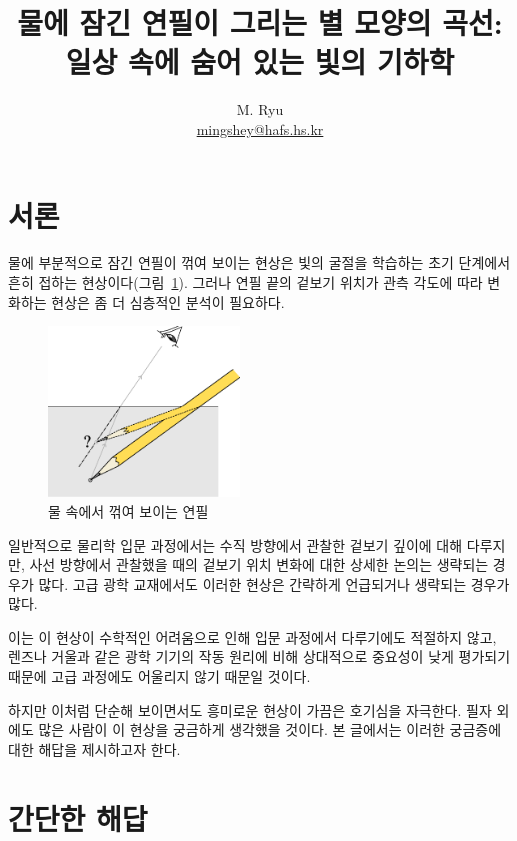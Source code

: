 \documentclass[twocolumn]{article}
\title{물에 잠긴 연필이 그리는 별 모양의 곡선:\\ 일상 속에 숨어 있는 빛의 기하학}
\author{M. Ryu \\ {\href{mailto:mingshey@hafs.hs.kr}{mingshey@hafs.hs.kr}}}
\begin{document}
\maketitle
\newcommand{\romana}{{a}}
\newcommand{\romanb}{{b}}
\newcommand{\romanA}{{A}}
\newcommand{\romanB}{{B}}
\newcommand{\greeka}{{\alpha}}
\newcommand{\greekb}{{\beta}}
\newcommand{\Aprime}{{A^{\prime}}}
\newcommand{\Bprime}{{B^{\prime}}}
\renewcommand{\figurename}{그림}
\section{서론}

물에 부분적으로 잠긴 연필이 꺾여 보이는 현상은 빛의 굴절을 학습하는 초기 단계에서 흔히 접하는 현상이다(\figurename\ \ref{fig:pencil}). 그러나 연필 끝의 겉보기 위치가 관측 각도에 따라 변화하는 현상은 좀 더 심층적인 분석이 필요하다. 

\begin{figure}[ht]
	\centering
	\includegraphics[width=2in]{figs/g164.eps}
	\caption{물 속에서 꺾여 보이는 연필}
	\label{fig:pencil}
\end{figure}

일반적으로 물리학 입문 과정에서는 수직 방향에서 관찰한 겉보기 깊이에 대해 다루지만, 사선 방향에서 관찰했을 때의 겉보기 위치 변화에 대한 상세한 논의는 생략되는 경우가 많다. 고급 광학 교재에서도 이러한 현상은 간략하게 언급되거나 생략되는 경우가 많다. 

이는 이 현상이 수학적인 어려움으로 인해 입문 과정에서 다루기에도 적절하지 않고, 렌즈나 거울과 같은 광학 기기의 작동 원리에 비해 상대적으로 중요성이 낮게 평가되기 때문에 고급 과정에도 어울리지 않기 때문일 것이다. 

하지만 이처럼 단순해 보이면서도 흥미로운 현상이 가끔은 호기심을 자극한다. 필자 외에도 많은 사람이 이 현상을 궁금하게 생각했을 것이다. 본 글에서는 이러한 궁금증에 대한 해답을 제시하고자 한다.


\section{간단한 해답}
\end{document}
